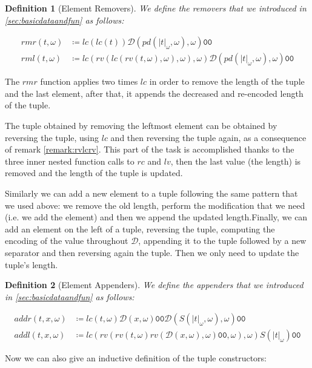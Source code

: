 \documentclass[10pt]{amsart}
\newcommand{\zero}{\mathtt{0}}
\newcommand{\oone}{\omega}
\newcommand{\pred}{pd}
\newcommand{\rv}{rv}
\newcommand{\db}{\mathcal D}
\newtheorem{defn}{Definition}
\begin{document}
\begin{defn}[Element Removers]

We define the removers that we introduced in \ref{sec:basicdataandfun} as follows:

\begin{align*}
rmr(t, \oone) &\coloneqq lc(lc(t)) \db(\pred(|t|_\oone, \oone), \oone)\zero\zero\\
rml(t, \oone) &\coloneqq lc(\rv(lc(\rv(t, \oone), \oone), \oone), \oone)\db(\pred(|t|_\oone, \oone), \oone)\zero\zero
\end{align*}

\end{defn}

The $rmr$ function applies two times $lc$ in order to remove the length of the tuple and the last element, after that, it appends the decreased and re-encoded length of the tuple.

The tuple obtained by removing the leftmost element can be obtained by reversing the tuple, using $lc$ and then reversing the tuple again, as a consequence of remark \ref{remark:rvlcrv}. This part of the task is accomplished thanks to the three inner nested function calls to $rc$ and $lv$, then the last value (the length) is removed and the length of the tuple is updated.

Similarly we can add a new element to a tuple following the same pattern that we used above: we remove the old length, perform the modification that we need (i.e. we add the element) and then we append the updated length.Finally, we can add an element on the left of a tuple, reversing the tuple, computing the encoding of the value throughout $\db$, appending it to the tuple followed by a new separator and then reversing again the tuple. Then we only need to update the tuple's length.

\begin{defn}[Element Appenders]

We define the appenders that we introduced in \ref{sec:basicdataandfun} as follows:

\begin{align*}
addr(t, x, \oone)&\coloneqq lc(t, \oone)\db(x, \oone)\zero\zero\db(S(|t|_\oone, \oone), \oone)\zero\zero\\
addl(t, x, \oone)&\coloneqq lc(\rv(\rv(t, \oone)\rv(\db(x, \oone), \oone)\zero\zero, \oone), \oone)S(|t|_\oone)\zero\zero
\end{align*}
\end{defn}

Now we can also give an inductive definition of the tuple constructors:
\end{document}
